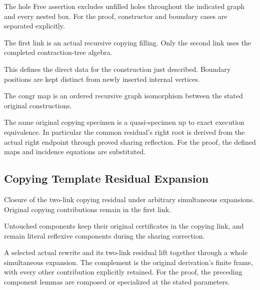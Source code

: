 The hole Free assertion excludes unfilled holes throughout the indicated graph and every nested box.
For the proof, constructor and boundary cases are separated explicitly.
\par{}

The first link is an actual recursive copying filling. Only the second link uses the completed contraction-tree algebra.
\par{}

This defines the direct data for the construction just described. Boundary positions are kept distinct from newly inserted internal vertices.
\par{}

The congr map is an ordered recursive graph isomorphism between the stated original constructions.
\par{}

The same original copying specimen is a quasi-specimen up to exact execution equivalence. In particular the common residual's right root is derived from the actual right endpoint through proved sharing reflection.
For the proof, the defined maps and incidence equations are substituted.
\par{}

\subsection{Copying Template Residual Expansion}
Closure of the two-link copying residual under arbitrary simultaneous expansions. Original copying contributions remain in the first link.

Untouched components keep their original certificates in the copying link, and remain literal reflexive components during the sharing correction.
\par{}

A selected actual rewrite and its two-link residual lift together through a whole simultaneous expansion. The complement is the original derivation's finite frame, with every other contribution explicitly retained.
For the proof, the preceding component lemmas are composed or specialized at the stated parameters.
\par{}

